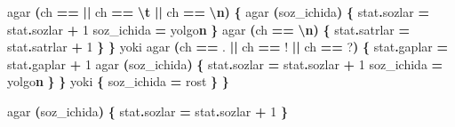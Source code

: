 \documentclass[a4paper,11pt,twoside,openright]{book}
\newenvironment{Shaded}{\begin{snugshade}}{\end{snugshade}}
\newcommand{\CharTok}[1]{\textcolor[rgb]{0.31,0.60,0.02}{#1}}
\newcommand{\DecValTok}[1]{\textcolor[rgb]{0.00,0.00,0.81}{#1}}
\newcommand{\ErrorTok}[1]{\textcolor[rgb]{0.64,0.00,0.00}{\textbf{#1}}}
\newcommand{\NormalTok}[1]{#1}
\newcommand{\OperatorTok}[1]{\textcolor[rgb]{0.81,0.36,0.00}{\textbf{#1}}}
\newcommand{\SpecialCharTok}[1]{\textcolor[rgb]{0.81,0.36,0.00}{\textbf{#1}}}
\begin{document}
\begin{Shaded}
\begin{Highlighting}[]
\NormalTok{        agar }\OperatorTok{(}\NormalTok{ch }\OperatorTok{==} \CharTok{\textquotesingle{} \textquotesingle{}} \OperatorTok{||}\NormalTok{ ch }\OperatorTok{==} \CharTok{\textquotesingle{}}\SpecialCharTok{\textbackslash{}t}\CharTok{\textquotesingle{}} \OperatorTok{||}\NormalTok{ ch }\OperatorTok{==} \CharTok{\textquotesingle{}}\SpecialCharTok{\textbackslash{}n}\CharTok{\textquotesingle{}}\OperatorTok{)} \OperatorTok{\{}
\NormalTok{            agar }\OperatorTok{(}\NormalTok{soz\_ichida}\OperatorTok{)} \OperatorTok{\{}
\NormalTok{                stat}\OperatorTok{.}\NormalTok{sozlar }\OperatorTok{=}\NormalTok{ stat}\OperatorTok{.}\NormalTok{sozlar }\OperatorTok{+} \DecValTok{1}
\NormalTok{                soz\_ichida }\OperatorTok{=}\NormalTok{ yolg}\CharTok{\textquotesingle{}o}\ErrorTok{n}
            \OperatorTok{\}}
\NormalTok{            agar }\OperatorTok{(}\NormalTok{ch }\OperatorTok{==} \CharTok{\textquotesingle{}}\SpecialCharTok{\textbackslash{}n}\CharTok{\textquotesingle{}}\OperatorTok{)} \OperatorTok{\{}
\NormalTok{                stat}\OperatorTok{.}\NormalTok{satrlar }\OperatorTok{=}\NormalTok{ stat}\OperatorTok{.}\NormalTok{satrlar }\OperatorTok{+} \DecValTok{1}
            \OperatorTok{\}}
        \OperatorTok{\}}\NormalTok{ yoki agar }\OperatorTok{(}\NormalTok{ch }\OperatorTok{==} \CharTok{\textquotesingle{}.\textquotesingle{}} \OperatorTok{||}\NormalTok{ ch }\OperatorTok{==} \CharTok{\textquotesingle{}!\textquotesingle{}} \OperatorTok{||}\NormalTok{ ch }\OperatorTok{==} \CharTok{\textquotesingle{}?\textquotesingle{}}\OperatorTok{)} \OperatorTok{\{}
\NormalTok{            stat}\OperatorTok{.}\NormalTok{gaplar }\OperatorTok{=}\NormalTok{ stat}\OperatorTok{.}\NormalTok{gaplar }\OperatorTok{+} \DecValTok{1}
\NormalTok{            agar }\OperatorTok{(}\NormalTok{soz\_ichida}\OperatorTok{)} \OperatorTok{\{}
\NormalTok{                stat}\OperatorTok{.}\NormalTok{sozlar }\OperatorTok{=}\NormalTok{ stat}\OperatorTok{.}\NormalTok{sozlar }\OperatorTok{+} \DecValTok{1}
\NormalTok{                soz\_ichida }\OperatorTok{=}\NormalTok{ yolg}\CharTok{\textquotesingle{}o}\ErrorTok{n}
            \OperatorTok{\}}
        \OperatorTok{\}}\NormalTok{ yoki }\OperatorTok{\{}
\NormalTok{            soz\_ichida }\OperatorTok{=}\NormalTok{ rost}
        \OperatorTok{\}}
    \OperatorTok{\}}

\NormalTok{    agar }\OperatorTok{(}\NormalTok{soz\_ichida}\OperatorTok{)} \OperatorTok{\{}
\NormalTok{        stat}\OperatorTok{.}\NormalTok{sozlar }\OperatorTok{=}\NormalTok{ stat}\OperatorTok{.}\NormalTok{sozlar }\OperatorTok{+} \DecValTok{1}
    \OperatorTok{\}}


\end{Highlighting}
\end{Shaded}
\end{document}
